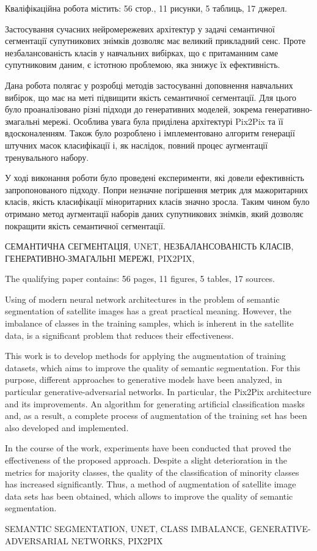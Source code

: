 
\abstractUkr

Кваліфікаційна робота містить: 56 стор., 11 рисунки, 5 таблиць, 17 джерел.

Застосування сучасних нейромережевих архітектур у
задачі семантичної сегментації супутникових знімків
дозволяє має великий прикладний сенс. Проте незбалансованість
класів у навчальних вибірках, що є притаманним
саме супутниковим даним, є істотною проблемою, яка
знижує їх ефективність.

Дана робота полягає у розробці методів
застосуванні доповнення навчальних вибірок, що має
на меті підвищити якість семантичної сегментації.
Для цього було проаналізовано різні підходи до генеративних
моделей, зокрема генеративно-змагальні мережі.
Особлива увага була приділена архітектурі Pix2Pix
та її вдосконаленням. Також було розроблено і імплементовано
алгоритм генерації штучних масок класифікації і, як наслідок,
повний процес аугментації тренувального набору.

У ході виконання роботи було проведені експерименти, які
довели ефективність запропонованого підходу. Попри незначне
погіршення метрик для мажоритарних класів, якість класифікації
міноритарних класів значно зросла. Таким чином було отримано
метод аугментації наборів даних супутникових знімків,
який дозволяє покращити якість семантичної сегментації.

\MakeUppercase{СЕМАНТИЧНА СЕГМЕНТАЦІЯ,
    UNET,  НЕЗБАЛАНСОВАНІСТЬ КЛАСІВ,
    ГЕНЕРАТИВНО-ЗМАГАЛЬНІ МЕРЕЖІ, PIX2PIX,}

\abstractEng

The qualifying paper contains: 56 pages, 11 figures, 5 tables, 17 sources.

Using of modern neural network architectures in
the problem of semantic segmentation of satellite images
has a great practical meaning. However, the imbalance
of classes in the training samples, which is inherent in the
satellite data, is a significant problem that reduces
their effectiveness.

This work is to develop methods for applying the
augmentation of training datasets, which aims to improve
the quality of semantic segmentation. For this purpose,
different approaches to generative models have been analyzed,
in particular generative-adversarial networks. In particular,
the Pix2Pix architecture and its
improvements. An algorithm for generating artificial
classification masks and, as a result, a complete process
of augmentation of the training set has been also developed
and implemented.

In the course of the work, experiments have been conducted
that proved the effectiveness of the proposed approach.
Despite a slight deterioration in the metrics for majority
classes, the quality of the classification of minority
classes has increased significantly. Thus, a method of
augmentation of satellite image data sets has been obtained,
which allows to improve the quality of semantic
segmentation.

\MakeUppercase{SEMANTIC SEGMENTATION, UNET,
    CLASS IMBALANCE, GENERATIVE-ADVERSARIAL NETWORKS,
    PIX2PIX}

\clearpage